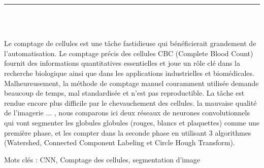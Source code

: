\documentclass[12pt]{report}
\newenvironment{changemargin}[2]{%
\begin{list}{}{%
\setlength{\topsep}{0pt}%
\setlength{\leftmargin}{#1}%
\setlength{\rightmargin}{#2}%
\setlength{\listparindent}{\parindent}%
\setlength{\itemindent}{\parindent}%
\setlength{\parsep}{\parskip}%
}%
\item[]}{\end{list}}
\begin{document}


\newpage

\vspace*{0.2in}

\thispagestyle{empty}

\begin{center}
    {\color{Black} \rule{3in}{1.4mm} }\\
    \vspace{0.1in}
    \scshape{\fontsize{34}{46}{\bfseries{\color{Black}{Résumé}}}}
    \\
    \vspace{0.6in}
\end{center}
\begin{changemargin}{0.9cm}{0.9cm}
\hspace*{0.16in}
\end{changemargin}

Le comptage de cellules est une tâche fastidieuse qui bénéficierait grandement de l'automatisation. Le comptage précis des cellules CBC (Complete Blood Count) fournit des informations quantitatives essentielles et joue un rôle clé dans la recherche biologique ainsi que dans les applications industrielles et biomédicales. Malheureusement, la méthode de comptage manuel couramment utilisée demande beaucoup de temps, mal standardisée et n'est pas reproductible. La tâche est rendue encore plus difficile par le chevauchement des cellules. la mauvaise qualité de l'imagerie ... , nous comparons ici deux réseaux de neurones convolutionnels qui vont segmenter les globules globules (rouges, blancs et plaquettes) comme une première phase, et les compter dans la seconde phase en utilisant 3 algorithmes (Watershed, Connected Component Labeling et Circle Hough Transform).

\vspace{1in}

\begin{changemargin}{0.9cm}{0.9cm}
Mots clés : CNN, Comptage des cellules, segmentation d'image
\end{changemargin}

\newpage

\vspace*{0.2in}

\thispagestyle{empty}
\end{document}
